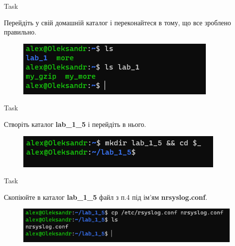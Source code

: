 \documentclass[a4paper,12pt]{article}
\newcommand{\RomanNumeralCaps}[1]{\MakeUppercase{\romannumeral #1}}
\begin{document}
    \begin{center}
        \Large{Task \RomanNumeralCaps{13}}
    \end{center}
    Перейдіть у свій домашній каталог і переконайтеся в тому, що все зроблено правильно.
    \begin{figure}[h!]
        \begin{minipage}[h]{1\linewidth}
            \centering
            \includegraphics[width=0.6\linewidth]{Prt sc/Figure_13.png}  
        \end{minipage}
    \end{figure}

    \begin{center}
        \Large{Task \RomanNumeralCaps{14}}
    \end{center}
    Створіть каталог \textbf{lab\_1\_5} і перейдіть в нього.
    \begin{figure}[h!]
        \begin{minipage}[h]{1\linewidth}
            \centering
            \includegraphics[width=0.6\linewidth]{Prt sc/Figure_14.png}  
        \end{minipage}
    \end{figure}

\newpage
    \begin{center}
        \Large{Task \RomanNumeralCaps{15}}
    \end{center}
    Скопіюйте в каталог \textbf{lab\_1\_5} файл з п.4 під ім'ям \textbf{nrsyslog.conf}.
    \begin{figure}[h!]
        \begin{minipage}[h]{1\linewidth}
            \centering
            \includegraphics[width=0.6\linewidth]{Prt sc/Figure_15.png}  
        \end{minipage}
    \end{figure}
\end{document}
